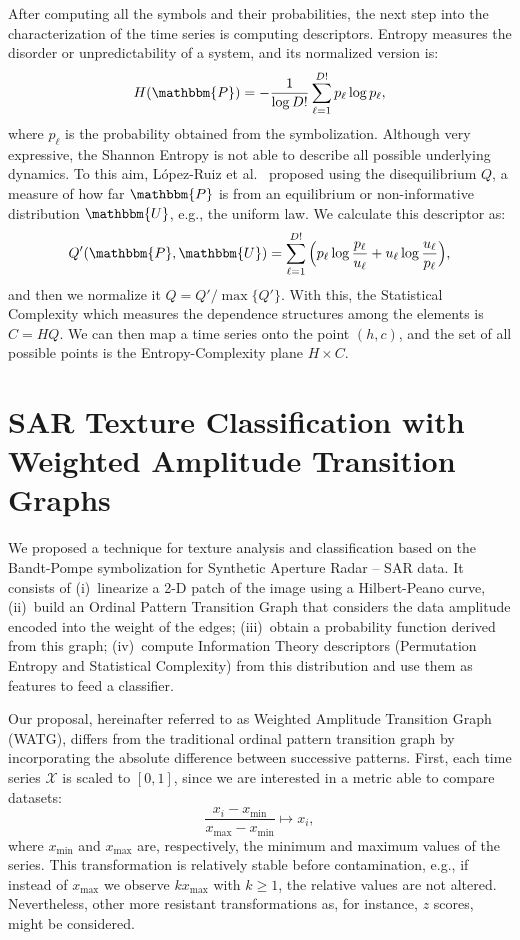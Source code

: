 \documentclass[a4,11pt]{pssbmac}
\begin{document}
	After computing all the symbols and their probabilities, the next step into the characterization of the time series is computing descriptors.
	Entropy measures the disorder or unpredictability of a system, and its normalized version is:	
	\begin{equation}
		H(\mathbbm{P}) = - \frac{1}{\log D!}\sum_{\ell = 1}^{D!} p_\ell \log p_\ell,
		\label{eq:Entropia}
	\end{equation}
	where $p_\ell$ is the probability obtained from the symbolization.
	Although very expressive, the Shannon Entropy is not able to describe all possible underlying dynamics.
	To this aim, L\'opez-Ruiz et al.~\cite{LopezRuiz1995} proposed using the disequilibrium  $Q$, a measure of how far $\mathbbm{P}$ is from an equilibrium or non-informative distribution $\mathbbm{U}$, e.g., the uniform law.
	We calculate this descriptor as:
	\begin{equation}
		Q'(\mathbbm{P}, \mathbbm{U}) = \sum_{\ell=1}^{D!} \Big(p_\ell \log\frac{p_\ell}{u_\ell} +
		u_\ell \log\frac{u_\ell}{p_\ell}
		\Big),
	\end{equation}
	and then we normalize it $Q = Q'/\max\{Q'\}$.
	With this, the Statistical Complexity which measures the dependence structures among the elements is $C = HQ$.
	We can then map a time series onto the point $(h, c)$, and the set of all possible points is the Entropy-Complexity plane $H \times C$.
	
	\section{SAR Texture Classification with Weighted Amplitude Transition Graphs}\label{WATG}
	
	We proposed a technique for texture analysis and classification based on the Bandt-Pompe symbolization for Synthetic Aperture Radar -- SAR data.
	It consists of
	(i)~linearize a \mbox{2-D} patch of the image using a Hilbert-Peano curve,
	(ii)~build an Ordinal Pattern Transition Graph that considers the data amplitude encoded into the weight of the edges;
	(iii)~obtain a probability function derived from this graph;
	(iv)~compute Information Theory descriptors (Permutation Entropy and Statistical Complexity) from this distribution and use them as features to feed a classifier.
	
	Our proposal, hereinafter referred to as Weighted Amplitude Transition Graph (WATG), differs from the traditional ordinal pattern transition graph by incorporating the absolute difference between successive patterns. 
	First, each time series $\mathcal{X}$ is scaled to $[0, 1]$, since we are interested in a metric able to compare datasets:
	\begin{equation}
		\frac{x_i - x_{\min}}{x_{\max} - x_{\min}} \longmapsto x_i,
		\label{eq:scaling}
	\end{equation}
	where $x_{\min}$ and $x_{\max}$ are, respectively, the minimum and maximum values of the series.
	This transformation is relatively stable before contamination, e.g., if instead of $x_{\max}$ we observe $k x_{\max}$ with $k\geq 1$, the relative values are not altered. 
	Nevertheless, other more resistant transformations as, for instance, $z$ scores, might be considered.
	
\end{document}
